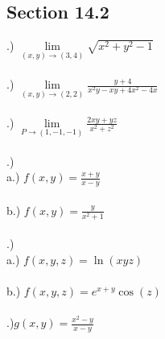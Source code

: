 \documentclass[12pt]{article}
\begin{document}
\subsection*{Section 14.2}

.) $\lim\limits_{(x,y) \to (3,4)} \sqrt{x^{2} + y^{2} - 1}$\\\\
.) $\lim\limits_{(x,y) \to (2,2)} \frac{y+4}{x^{2}y -xy + 4x^{2} - 4x}$\\\\
.) $\lim\limits_{P \to (1, -1, -1)}\frac{2xy+yz}{x^{2}+z^{2}}$\\\\
.) \\
\noindent a.) $f(x, y) = \frac{x+y}{x-y}$\\\\
\noindent b.) $f(x,y) = \frac{y}{x^{2} + 1}$\\\\
.) \\
\noindent a.) $f(x, y,z) = \ln(xyz)$\\\\
\noindent b.) $f(x, y,z) = e^{x+y}\cos(z)$\\\\
.)$g(x,y) = \frac{x^{2}-y}{x -y}$\\\\
\end{document}
